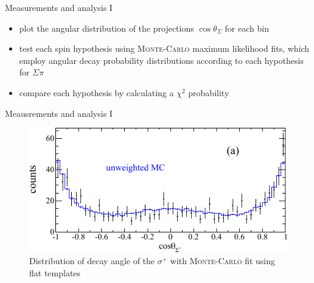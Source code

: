 \documentclass[11pt,aspectratio=1610,dvipsnames]{beamer}
\begin{document}
\begin{frame}{Measurements and analysis I }
	\begin{minipage}{\linewidth}
	\begin{tcolorbox}[colback=black!10,colframe=gray!20!black,title=Analysis procedure] 
		\begin{itemize}
			\item plot the angular distribution of the projections  $\cos\theta_\Sigma$ for each bin
			\item test each spin hypothesis using \textsc{Monte-Carlo} maximum likelihood fits, which employ angular decay probability distributions according to each hypothesis for $\Sigma\pi$ 
			\item compare each hypothesis by calculating a $\chi^2$ probability
		\end{itemize}
	\end{tcolorbox}	

\end{minipage}
\end{frame}
\begin{frame}{Meausrements and analysis I}
	\begin{figure}
		\centering
		\includegraphics[width=\linewidth]{spin_half}
		\caption*{Distribution of decay angle of the $\sigma^+$ with \textsc{Monte-Carlo} fit using flat templates \citet{spinparity}}
	\end{figure}
\end{frame}
\end{document}
